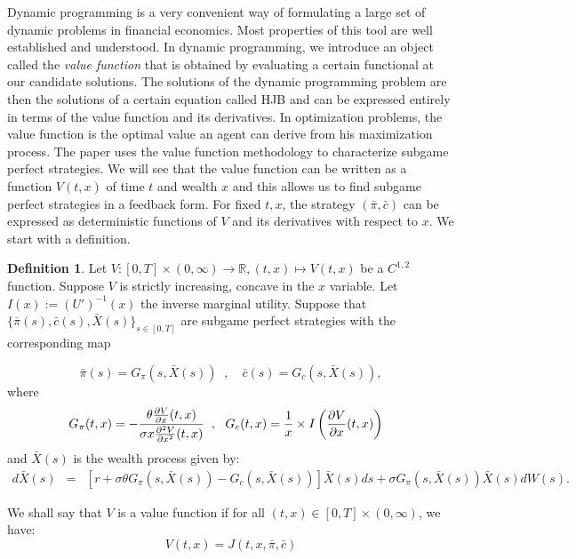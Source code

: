 \documentclass[11pt, psfig]{article}
\theoremstyle{definition}
\newtheorem{definition}[theorem]{Definition}
\theoremstyle{remark}
\numberwithin{equation}{section}
\begin{document}
Dynamic programming is a very convenient way of formulating a large set of dynamic problems in financial economics. Most properties of this tool are well established and understood.
In dynamic programming, we introduce an object called the \emph{value function} that is obtained by evaluating a certain functional at our candidate solutions. The solutions of the dynamic programming problem are then the solutions of a certain equation called HJB and can be expressed entirely in terms of the value function and its derivatives.
In optimization problems, the value function is the optimal value an agent can derive from his maximization process.
 The paper \cite{Ek_Mb_Pi1} uses the value function methodology to characterize subgame perfect strategies. We will see that the value function can be written as a function $V(t,x)$ of time $t$ and wealth $x$ and this allows us to find subgame perfect strategies 
in a feedback form. For fixed $t, x$, the strategy $(\bar{\pi}, \bar{c})$ can be expressed as deterministic functions of $V$ and its derivatives with respect to $x$.
 We start with a definition.
\begin{definition}\label{def_extendedHJB}
 Let $V : [0,T] \times (0,\infty) \rightarrow \mathbb{R}, (t, x)\mapsto V(t,x)$ be a $C^{1,2}$ function. Suppose $V$ is strictly increasing, concave in the $x$ variable.
Let $I(x):=(U')^{-1}(x)$ the inverse marginal utility.
Suppose that $\{\bar{\pi }(s),\bar{c}(s), \bar{X}(s)\}_{s\in [0,T]}$ are subgame perfect strategies with the corresponding map

\begin{equation}\label{eqbarpi_barc}
\bar{\pi}(s)={G_{\pi}(s,\bar{X}(s))}\;\;,\quad \bar{c}(s)=G_{c}(s,\bar{X}%
(s)), 
\end{equation}%
where 
\begin{equation}\label{eqGpi_Gc}
\!\!\!\!\! G_{\pi}(t,x)=-\frac{\theta \frac{\partial V}{\partial x}(t,x)}{\sigma x
\frac{\partial ^{2}V}{\partial x^{2}}(t,x)}\;\;,\ \ G_{c}(t,x)=\frac{1}{x}\times I\left( \frac{%
\partial V}{\partial x}(t,x)\right) \end{equation}%
and $\bar{X}(s)$ is the wealth process given by:
%
\begin{eqnarray}\label{eqdbarX}
d\bar{X}(s)&=&[r+\sigma\theta G_{\pi}(s,\bar{X}(s))-G_{c}(s,\bar{X}(s))]\bar{X}(s)ds +\sigma G_{\pi}(s,\bar{X}(s))\bar{X}(s)dW(s). 
\end{eqnarray}

We shall say that $V$ is a value function if for all $(t, x)\in [0,T]\times (0,\infty) $, we have:%
\begin{equation}\label{eqV_equals_J}
V(t,x)=J(t,x,\bar{\pi},\bar{c})  
\end{equation}
%
%


\end{definition}
\end{document}
